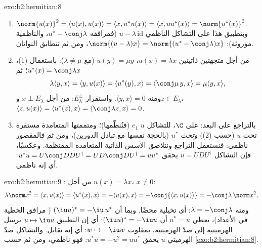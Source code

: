 \begin{solution}{exo:b2:hermitian:8}
\begin{enumerate}
  \item $\norm{u(x)}^2 = \langle u(x), u(x)\rangle = \langle x,
        u^*u(x)\rangle = \langle x, uu^*(x)\rangle =
        \norm{u^*(x)}^2$. وبتطبيق هذا على التشاكل الناظمي $u -
        \lambda\,\mathrm{id}$ (فمرافقه $u^* -
        \conj\lambda$، والناظمية موروثة): $\norm{(u -
        \lambda)x} = \norm{(u^* - \conj\lambda)x}$، ومن ثم تتطابق
        النواتان.
  \item من أجل متجهتين ذاتيتين $u(x) = \lambda x$، $u(y) = \mu y$
        (مع $\lambda \neq \mu$): باستعمال (1)، $u^*(x) = \conj\lambda x$؛
        ثم
        \[
        \lambda\langle y, x\rangle = \langle y, u(x)\rangle
        = \langle u^*(y), x\rangle = \langle \conj\mu\, y, x\rangle
        = \mu \langle y, x\rangle ,
        \]
        ومنه $\langle y, x\rangle = 0$. واستقرار $E_\lambda^\perp$:
        من أجل $x \perp E_\lambda$ و$z \in E_\lambda$، $\langle z,
        u(x)\rangle = \langle u^*(z), x\rangle =
        \langle\conj\lambda z, x\rangle = 0$.
  \item بالتراجع على البعد: على $\C$، للتشاكل $u$ 
        $e_1$ (فنُنظّمها)؛ ومتممتها المتعامدة مستقرة
        تحت $u$ (حسب (2)) \emph{وتحت} $u^*$ (بالحجة نفسها
        مع تبادل الدورين)، ومن ثم فالمقصور ناظمي: فنستعمل التراجع
        ونتلاصق الأسس الذاتية المتعامدة الممنظمة. وعكسيًا، فإن التشاكل
        $u = UDU^\dagger$   يحقق $u^*u
        = U\conj D D U^\dagger = U D\conj D U^\dagger = uu^*$:
        أي إنه ناظمي.
\end{enumerate}
\end{solution}

\begin{solution}{exo:b2:hermitian:9}
: من أجل $u(x) = \lambda x$، $x \neq 0$:
\[
\lambda\norm x^2 = \langle x, u(x)\rangle
= \langle u^*(x), x\rangle = -\langle u(x), x\rangle
= -\conj{\langle x, u(x)\rangle} = -\conj\lambda\,\norm x^2 ,
\]
ومنه $\lambda = -\conj\lambda$: أي تخيلية محضًا. وبما أن $(\iu
u)^* = -\iu\,u^*$ ( مرافق الخطية في الأعداد)،
يعطي $u^* = u$ أن $(\iu u)^* = -\iu u$: أي إن التطبيق $u \mapsto \iu u$
يرسل الهرميتية إلى ضدّ الهرميتية، بمقلوب $w \mapsto -\iu
w$: أي إنه تقابل. والتشاكل ضدّ الهرميتي $u$ يحقق $u^*u = -u^2 =
uu^*$: فهو ناظمي، ومن ثم   حسب
\cref{exo:b2:hermitian:8}.
\end{solution}

